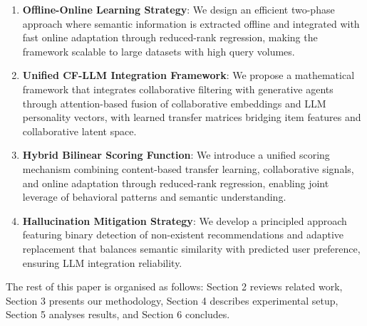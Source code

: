 \documentclass[acmsmall]{acmart}
\begin{document}
\begin{enumerate}
\item \textbf{Offline-Online Learning Strategy}: We design an efficient two-phase approach where semantic information is extracted offline and integrated with fast online adaptation through reduced-rank regression, making the framework scalable to large datasets with high query volumes.
\item \textbf{Unified CF-LLM Integration Framework}: We propose a mathematical framework that integrates collaborative filtering with generative agents through attention-based fusion of collaborative embeddings and LLM personality vectors, with learned transfer matrices bridging item features and collaborative latent space.

\item \textbf{Hybrid Bilinear Scoring Function}: We introduce a unified scoring mechanism combining content-based transfer learning, collaborative signals, and online adaptation through reduced-rank regression, enabling joint leverage of behavioral patterns and semantic understanding.

\item \textbf{Hallucination Mitigation Strategy}: We develop a principled approach featuring binary detection of non-existent recommendations and adaptive replacement that balances semantic similarity with predicted user preference, ensuring LLM integration reliability.

\end{enumerate}


The rest of this paper is organised as follows: Section 2 reviews related work, Section 3 presents our methodology, Section 4 describes experimental setup, Section 5 analyses results, and Section 6 concludes.


\end{document}
